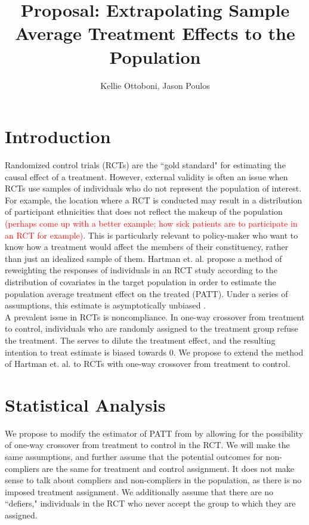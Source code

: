 \documentclass{article}
\title{Proposal: Extrapolating Sample Average Treatment Effects to the Population}
\author{Kellie Ottoboni, Jason Poulos}
\begin{document}
\maketitle

\section{Introduction}
Randomized control trials (RCTs) are the ``gold standard" for estimating the causal effect of a treatment.  However, external validity is often an issue when RCTs use samples of individuals who do not represent the population of interest.  For example, the location where a RCT is conducted may result in a distribution of participant ethnicities that does not reflect the makeup of the population \textcolor{red}{(perhaps come up with a better example; how sick patients are to participate in an RCT for example)}.  This is particularly relevant to policy-maker who want to know how a treatment would affect the members of their constituency, rather than just an idealized sample of them.  Hartman et. al. propose a method of reweighting the responses of individuals in an RCT study according to the distribution of covariates in the target population in order to estimate the population average treatment effect on the treated (PATT).  Under a series of assumptions, this estimate is asymptotically unbiased \cite{Hartman}. \\

A prevalent issue in RCTs is noncompliance.  In one-way crossover from treatment to control, individuals who are randomly assigned to the treatment group refuse the treatment.  The serves to dilute the treatment effect, and the resulting intention to treat estimate is biased towards $0$.  We propose to extend the method of Hartman et. al. to RCTs with one-way crossover from treatment to control.

\section{Statistical Analysis}
We propose to modify the estimator of PATT from \cite{Hartman} by allowing for the possibility of one-way crossover from treatment to control in the RCT.  We will make the same assumptions, and further assume that the potential outcomes for non-compliers are the same for treatment and control assignment.  It does not make sense to talk about compliers and non-compliers in the population, as there is no imposed treatment assignment.  We additionally assume that there are no ``defiers," individuals in the RCT who never accept the group to which they are assigned. \\
\end{document}
